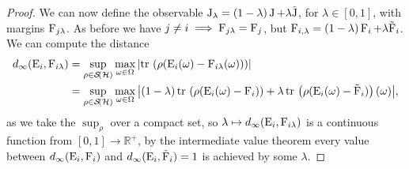 \begin{lem}
\begin{proof}
    We can now define the observable $\operatorname{J}_\lambda = (1-\lambda) \operatorname{J} + \lambda \tilde{\operatorname{J}}$, for $\lambda\in[0,1]$, with margins $\operatorname{F}_{j \lambda}$. As before we have $j\neq i \implies \operatorname{F}_{j\lambda} = \operatorname{F}_j$, but $\operatorname{F}_{i,\lambda} = (1-\lambda)\operatorname{F}_i + \lambda \tilde{\operatorname{F}}_i$. We can compute the distance
    \begin{align}
      d_\infty(\ope_i, \opf_{i\lambda}) &= \sup_{\rho\in\dops[\hcal]}\max_{\omega\in\Omega} \abs{\tr{\rho(\ope_i(\omega) - \opf_{i\lambda}(\omega))}}\\
                                        &= \sup_{\rho\in\dops[\hcal]}\max_{\omega\in\Omega} \abs{(1-\lambda)\tr{\rho(\ope_i(\omega) - \opf_{i})} + \lambda\tr{\rho(\ope_i(\omega) - \tilde{\opf}_{i})}(\omega)},
    \end{align}
    as we take the $\sup_\rho$ over a compact set, so $\lambda\mapsto d_\infty(\operatorname{E}_i,\operatorname{F}_{i\lambda})$ is a continuous function from $[0,1]\to\mathbb{R}^+$, by the intermediate value theorem every value between $d_\infty(\operatorname{E}_i, \operatorname{F}_{i})$ and $d_\infty(\operatorname{E}_i, \tilde{\operatorname{F}}_i) = 1$ is achieved by some $\lambda$.
  \end{proof}
\end{lem}

